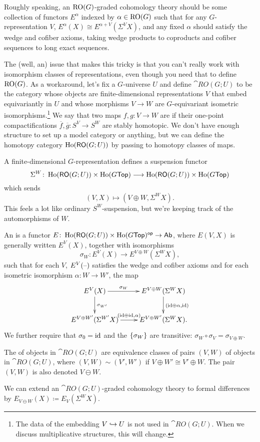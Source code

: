 Roughly speaking, an $\mathrm{RO}(G)$-graded cohomology theory should be some collection of functors $E^\alpha$ indexed by
$\alpha\in\mathrm{RO}(G)$ such that for any $G$-representation $V$, $E^\alpha(X) \cong E^{\alpha+V}(\Sigma^V X)$, and any
fixed $\alpha$ should satisfy the wedge and cofiber axioms, taking wedge products to coproducts and cofiber
sequences to long exact sequences.

The (well, an) issue that makes this tricky is that you can't really work with isomorphism classes of
representations, even though you need that to define $\mathrm{RO}(G)$. As a workaround, let's fix a $G$-universe $U$ and
define $\cat{RO}(G;U)$ to be the category whose objects are finite-dimensional representations $V$ that embed
equivariantly in $U$ and whose morphisms $V\to W$ are $G$-equivariant isometric isomorphisms.\footnote{The data of
the embedding $V\hookrightarrow U$ is not used in $\cat{RO}(G;U)$. When we discuss multiplicative structures, this will
change.} We say that two maps $f,g\colon V\to W$ are  if their one-point compactifications
$\overline f, \overline g\colon S^V\to S^W$ are stably homotopic. We don't have enough structure to set up a model
category or anything, but we can define the homotopy category $\operatorname{Ho}(\mathsf{RO}(G;U))$ by passing to homotopy classes
of maps.

A finite-dimensional $G$-representation defines a suspension functor
\[\Sigma^W\colon \operatorname{Ho}(\mathsf{RO}(G;U))\times\operatorname{Ho}(G\mathsf{Top})\longrightarrow \operatorname{Ho}(\mathsf{RO}(G;U))\times\operatorname{Ho}(G\mathsf{Top})\]
which sends
\[(V,X)\mapsto (V\oplus W, \Sigma^W X).\]
This feels a lot like ordinary $S^W$-suspension, but we're keeping track of the automorphisms of $W$.
\begin{defn}
An  is a functor $E\colon\operatorname{Ho}(\mathsf{RO}(G;U))\times\operatorname{Ho}(G\mathsf{Top})^{\mathsf{op}}\to\mathsf{Ab}$,
where $E(V,X)$ is generally written $E^V(X)$, together with
isomorphisms
\[\sigma_W\colon E^V(X)\longrightarrow E^{V\oplus W}(\Sigma^W X),\]
such that for each $V$, $E^V(\text{--})$ satisfies the wedge and cofiber axioms and for each isometric isomorphism
$\alpha\colon W\to W'$, the map
\[\xymatrix{
	E^V(X)\ar[r]^-{\sigma_W}\ar[d]^{\sigma_{W'}} & E^{V\oplus W}(\Sigma^W X)\ar[d]^{(\id\oplus\alpha, \id)}\\
	E^{V\oplus W'}(\Sigma^{W'}X)\ar[r]^{(\id\oplus\id, \alpha)} & E^{V\oplus W'}(\Sigma^W X).
}\]
We further require that $\sigma_0 = \mathrm{id}$ and the $\{\sigma_W\}$ are transitive: $\sigma_W\circ\sigma_V =
\sigma_{V\oplus W}$.
\end{defn}
\begin{defn}
The  of objects in $\cat{RO}(G;U)$ are equivalence classes of pairs $(V,W)$ of objects in
$\cat{RO}(G;U)$, where $(V,W)\sim(V',W')$ if $V\oplus W'\cong V'\oplus W$. The pair $(V,W)$ is also denoted
$V\ominus W$.
\end{defn}
We can extend an $\cat{RO}(G;U)$-graded cohomology theory to formal differences by $E_{V\ominus W}(X)\coloneqq
E_V(\Sigma^W X)$.

